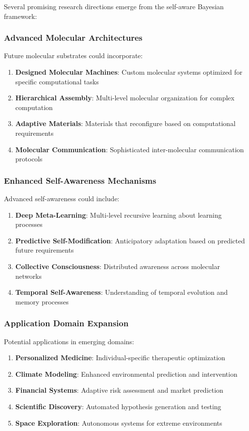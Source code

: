 \documentclass[12pt,a4paper]{article}
\begin{document}
Several promising research directions emerge from the self-aware Bayesian framework:

\subsubsection{Advanced Molecular Architectures}

Future molecular substrates could incorporate:

\begin{enumerate}
\item \textbf{Designed Molecular Machines}: Custom molecular systems optimized for specific computational tasks
\item \textbf{Hierarchical Assembly}: Multi-level molecular organization for complex computation
\item \textbf{Adaptive Materials}: Materials that reconfigure based on computational requirements
\item \textbf{Molecular Communication}: Sophisticated inter-molecular communication protocols
\end{enumerate}

\subsubsection{Enhanced Self-Awareness Mechanisms}

Advanced self-awareness could include:

\begin{enumerate}
\item \textbf{Deep Meta-Learning}: Multi-level recursive learning about learning processes
\item \textbf{Predictive Self-Modification}: Anticipatory adaptation based on predicted future requirements
\item \textbf{Collective Consciousness}: Distributed awareness across molecular networks
\item \textbf{Temporal Self-Awareness}: Understanding of temporal evolution and memory processes
\end{enumerate}

\subsubsection{Application Domain Expansion}

Potential applications in emerging domains:

\begin{enumerate}
\item \textbf{Personalized Medicine}: Individual-specific therapeutic optimization
\item \textbf{Climate Modeling}: Enhanced environmental prediction and intervention
\item \textbf{Financial Systems}: Adaptive risk assessment and market prediction
\item \textbf{Scientific Discovery}: Automated hypothesis generation and testing
\item \textbf{Space Exploration}: Autonomous systems for extreme environments
\end{enumerate}
\end{document}
